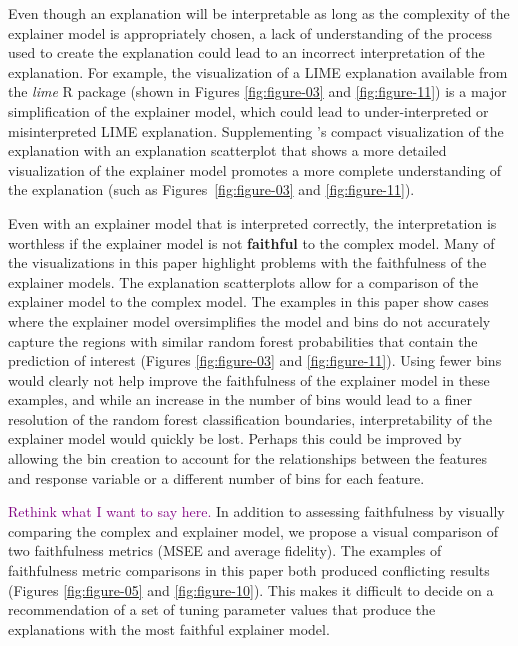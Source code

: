 \documentclass[AMS,STIX2COL]{WileyNJD-v2}\usepackage[]{graphicx}\usepackage[]{color}
\newcommand{\kgc}[1]{\textcolor{purple}{#1}}
\renewcommand{\sout}[1]{\unskip}
\begin{document}
Even though an explanation will be interpretable as long as the complexity of the explainer model is appropriately chosen, a lack of understanding of the process used to create the explanation could lead to an incorrect interpretation of the explanation. For example, the visualization of a LIME explanation available from the \emph{lime} R package \citep{pedersen:2020} (shown in Figures \ref{fig:figure-03} and \ref{fig:figure-11}) is a major simplification of the explainer model, which could lead to under-interpreted or misinterpreted LIME explanation. Supplementing \citet{pedersen:2020}'s compact visualization of the explanation with an explanation scatterplot that shows a more detailed visualization of the explainer model promotes a more complete understanding of the explanation (such as Figures~\ref{fig:figure-03} and \ref{fig:figure-11}).

Even with an explainer model that is interpreted correctly, the interpretation is worthless if the explainer model is not \textbf{faithful} to the complex model. \sout{This claim can be assessed using the diagnostic plots suggested in this paper.} Many of the visualizations in this paper highlight problems with the faithfulness of the explainer models. The explanation scatterplots allow for a comparison of the explainer model to the complex model. The examples in this paper show cases where the explainer model oversimplifies the model and bins do not accurately capture the regions with similar random forest probabilities that contain the prediction of interest (Figures \ref{fig:figure-03} and \ref{fig:figure-11}). Using fewer bins would clearly not help improve the faithfulness of the explainer model in these examples, and while an increase in the number of bins would lead to a finer resolution of the random forest classification boundaries, interpretability of the explainer model would quickly be lost. Perhaps this could be improved by allowing the bin creation to account for the relationships between the features and response variable or a different number of bins for each feature.

\kgc{Rethink what I want to say here.} In addition to assessing faithfulness by visually comparing the complex and explainer model, we propose a visual comparison of two faithfulness metrics (MSEE and average fidelity). The examples of faithfulness metric comparisons in this paper both produced conflicting results (Figures \ref{fig:figure-05} and \ref{fig:figure-10}). This makes it difficult to decide on a recommendation of a set of tuning parameter values that produce the explanations with the most faithful explainer model.
\end{document}
